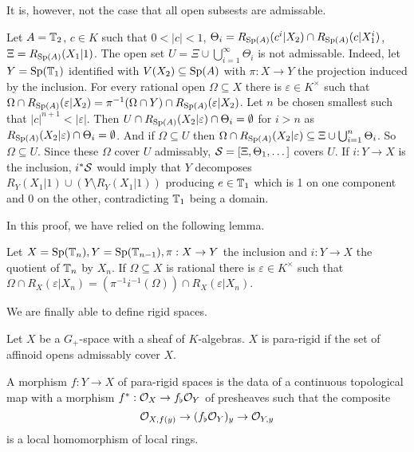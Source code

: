 It is, however, not the case that all open subsests are admissable. 
\begin{example}
    Let $A=\mathbb{T}_{2}$, $c\in K$ such that $0<|c|<1$, $\Theta_{i}=R_{\mathrm{Sp}(A)}(c^{i}|X_{2})\cap R_{\mathrm{Sp}(A)}(c|X_{1}^{i})$, $\Xi=R_{\mathrm{Sp}(A)}(X_{1}|1)$. The open set $U=\Xi\cup\bigcup_{i=1}^{\infty}\Theta_{i}$ is not admissable. Indeed, let $Y=\mathrm{Sp}(\mathbb{T}_{1})$ identified with $V(X_{2})\subseteq\mathrm{Sp}(A)$ with $\pi:X\to Y$ the projection induced by the inclusion. For every rational open $\Omega\subseteq X$ there is $\varepsilon\in K^{\times}$ such that $\Omega\cap R_{\mathrm{Sp}(A)}(\varepsilon|X_{2})=\pi^{-1}(\Omega\cap Y)\cap R_{\mathrm{Sp}(A)}(\varepsilon|X_{2})$. Let $n$ be chosen smallest such that $|c|^{n+1}<|\varepsilon|$. Then $U\cap R_{\mathrm{Sp}(A)}(X_{2}|\varepsilon)\cap\Theta_{i}=\emptyset$ for $i>n$ as $R_{\mathrm{Sp}(A)}(X_{2}|\varepsilon)\cap\Theta_{i}=\emptyset$. And if $\Omega\subseteq U$ then $\Omega\cap R_{\mathrm{Sp}(A)}(X_{2}|\varepsilon)\subseteq\Xi\cup\bigcup_{i=1}^{n}\Theta_{i}$. So $\Omega\subseteq U$. Since these $\Omega$ cover $U$ admissably, $\mathcal{S}=[\Xi,\Theta_{1},\dots]$ covers $U$. If $i:Y\to X$ is the inclusion, $i^{*}\mathcal{S}$ would imply that $Y$ decomposes $R_{Y}(X_{1}|1)\cup(Y\setminus R_{Y}(X_{1}|1))$ producing $e\in \mathbb{T}_{1}$ which is 1 on one component and 0 on the other, contradicting $\mathbb{T}_{1}$ being a domain. 
\end{example}
In this proof, we have relied on the following lemma. 
\begin{lemma}
    Let $X=\mathrm{Sp}(\mathbb{T}_{n}),Y=\mathrm{Sp}(\mathbb{T}_{n-1}), \pi:X\to Y$ the inclusion and $i:Y\to X$ the quotient of $\mathbb{T}_{n}$ by $X_{n}$. If $\Omega\subseteq X$ is rational there is $\varepsilon\in K^{\times}$ such that $\Omega\cap R_{X}(\varepsilon|X_{n})=(\pi^{-1}i^{-1}(\Omega))\cap R_{X}(\varepsilon|X_{n})$. 
\end{lemma}
We are finally able to define rigid spaces. 
\begin{definition}\label{def: para-rigid space}
    Let $X$ be a $G_{+}$-space with a sheaf of $K$-algebras. $X$ is para-rigid if the set of affinoid opens admissably cover $X$. 
\end{definition}
\begin{definition}\label{def: morphism of pararigid spaces}
    A morphism $f:Y\to X$ of para-rigid spaces is the data of a continuous topological map with a morphism $f^{*}:\mathcal{O}_{X}\to f_{\flat}\mathcal{O}_{Y}$ of presheaves such that the composite 
    $$\mathcal{O}_{X,f(y)}\to(f_{\flat}\mathcal{O}_{Y})_{y}\to\mathcal{O}_{Y,y}$$
    is a local homomorphism of local rings. 
\end{definition}

